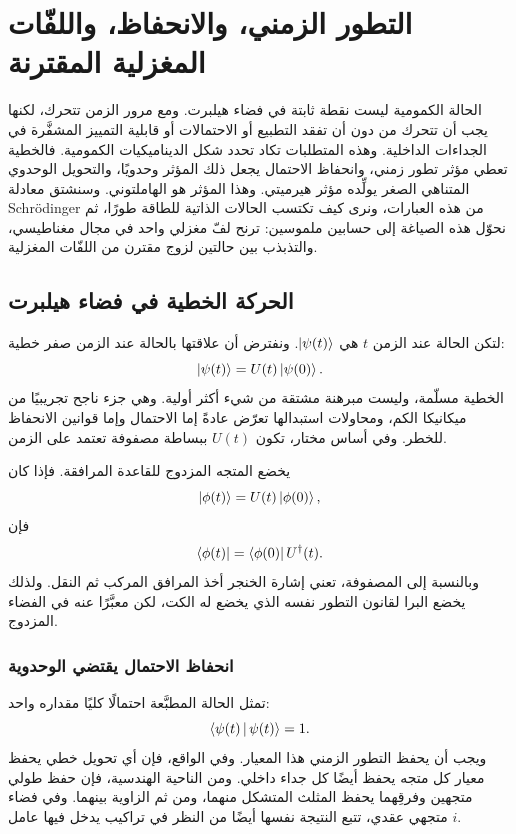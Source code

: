 \chapter{التطور الزمني، والانحفاظ، واللفّات المغزلية المقترنة}

الحالة الكمومية ليست نقطة ثابتة في فضاء هيلبرت. ومع مرور الزمن تتحرك، لكنها يجب أن تتحرك من دون أن تفقد التطبيع أو الاحتمالات أو قابلية التمييز المشفَّرة في الجداءات الداخلية. وهذه المتطلبات تكاد تحدد شكل الديناميكيات الكمومية. فالخطية تعطي مؤثر تطور زمني، وانحفاظ الاحتمال يجعل ذلك المؤثر وحدويًا، والتحويل الوحدوي المتناهي الصغر يولِّده مؤثر هيرميتي. وهذا المؤثر هو الهاملتوني. وسنشتق معادلة Schr\"odinger من هذه العبارات، ونرى كيف تكتسب الحالات الذاتية للطاقة طورًا، ثم نحوّل هذه الصياغة إلى حسابين ملموسين: ترنح لفّ مغزلي واحد في مجال مغناطيسي، والتذبذب بين حالتين لزوج مقترن من اللفّات المغزلية.

\section{الحركة الخطية في فضاء هيلبرت}

لتكن الحالة عند الزمن \(t\) هي \(\left\lvert\psi(t)\right\rangle\). ونفترض أن علاقتها بالحالة عند الزمن صفر خطية:
\begin{equation}
\left\lvert\psi(t)\right\rangle=U(t)\left\lvert\psi(0)\right\rangle.
\end{equation}
الخطية مسلّمة، وليست مبرهنة مشتقة من شيء أكثر أولية. وهي جزء ناجح تجريبيًا من ميكانيكا الكم، ومحاولات استبدالها تعرّض عادةً إما الاحتمال وإما قوانين الانحفاظ للخطر. وفي أساس مختار، تكون \(U(t)\) ببساطة مصفوفة تعتمد على الزمن.

يخضع المتجه المزدوج للقاعدة المرافقة. فإذا كان
\begin{equation}
\left\lvert\phi(t)\right\rangle=U(t)\left\lvert\phi(0)\right\rangle,
\end{equation}
فإن
\begin{equation}
\left\langle\phi(t)\right\rvert=\left\langle\phi(0)\right\rvert U^\dagger(t).
\end{equation}
وبالنسبة إلى المصفوفة، تعني إشارة الخنجر أخذ المرافق المركب ثم النقل. ولذلك يخضع البرا لقانون التطور نفسه الذي يخضع له الكت، لكن معبَّرًا عنه في الفضاء المزدوج.

\subsection{انحفاظ الاحتمال يقتضي الوحدوية}

تمثل الحالة المطبَّعة احتمالًا كليًا مقداره واحد:
\begin{equation}
\left\langle\psi(t)\,\middle|\,\psi(t)\right\rangle=1.
\end{equation}
ويجب أن يحفظ التطور الزمني هذا المعيار. وفي الواقع، فإن أي تحويل خطي يحفظ معيار كل متجه يحفظ أيضًا كل جداء داخلي. ومن الناحية الهندسية، فإن حفظ طولي متجهين وفرقِهما يحفظ المثلث المتشكل منهما، ومن ثم الزاوية بينهما. وفي فضاء متجهي عقدي، تتبع النتيجة نفسها أيضًا من النظر في تراكيب يدخل فيها عامل \(i\).

